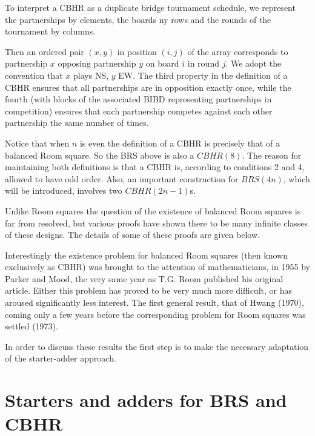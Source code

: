 \documentclass[
  12pt,
  a4paper]{book}
\begin{document}
To interpret a CBHR as a duplicate bridge tournament schedule, we
represent the partnerships by elements, the boards ny rows and the
rounds of the tournament by columns.

Then an ordered pair \((x,y)\) in position \((i,j)\) of the array
corresponds to partnership \(x\) opposing partnership \(y\) on board
\(i\) in round \(j\). We adopt the convention that \(x\) plays NS, \(y\)
EW. The third property in the definition of a CBHR ensures that all
partnerships are in opposition exactly once, while the fourth (with
blocks of the associated BIBD representing partnerships in competition)
ensures that each partnership competes against each other partnership
the same number of times.

Notice that when \(n\) is even the definition of a CBHR is precisely
that of a balanced Room square. So the BRS above is also a \(CBHR(8)\).
The reason for maintaining both definitions is that a CBHR is, according
to conditions 2 and 4, allowed to have odd order. Also, an important
construction for \(BRS(4n)\), which will be introduced, involves two
\(CBHR(2n-1)\)s.

Unlike Room squares the question of the existence of balanced Room
squares is far from resolved, but various proofs have shown there to be
many infinite classes of these designs. The details of some of these
proofs are given below.

Interestingly the existence problem for balanced Room squares (then
known exclusively as CBHR) was brought to the attention of
mathematicians, in 1955 by Parker and Mood, the very same year as T.G.
Room published his original article. Either this problem has proved to
be very much more difficult, or has aroused significantly less interest.
The first general result, that of Hwang (1970), coming only a few years
before the corresponding problem for Room squares was settled (1973).

In order to discuss these results the first step is to make the
necessary adaptation of the starter-adder approach.

\hypertarget{starters-and-adders-for-brs-and-cbhr}{%
\section{Starters and adders for BRS and
CBHR}\label{starters-and-adders-for-brs-and-cbhr}}
\end{document}
